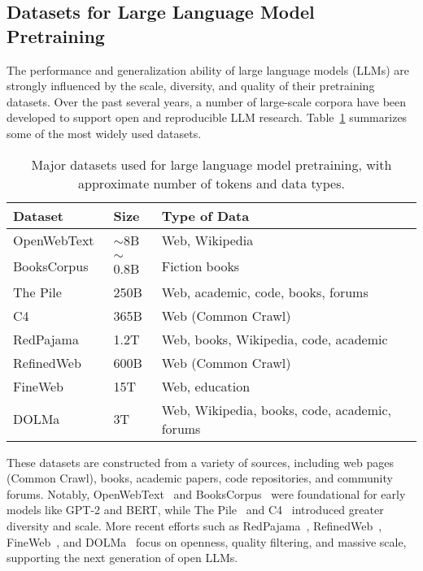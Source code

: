 \subsection{Datasets for Large Language Model Pretraining}
The performance and generalization ability of large language models (LLMs) are strongly influenced by the scale, diversity, and quality of their pretraining datasets. Over the past several years, a number of large-scale corpora have been developed to support open and reproducible LLM research. Table~\ref{tab:llm-datasets} summarizes some of the most widely used datasets.
\begin{table}[h]
\centering
\begin{tabular}{p{3.5cm} p{1.5cm} p{8.5cm}}
\toprule
\textbf{Dataset} & \textbf{Size} & \textbf{Type of Data} \\
\midrule
OpenWebText~\citep{gokaslan2019openweb} & $\sim$8B & Web, Wikipedia \\
BooksCorpus~\citep{zhu2015aligning} & $\sim$0.8B & Fiction books \\
The Pile~\citep{gao2020pile} & 250B & Web, academic, code, books, forums \\
C4~\citep{raffel2020t5} & 365B & Web (Common Crawl) \\
RedPajama~\citep{together2023redpajama} & 1.2T & Web, books, Wikipedia, code, academic \\
RefinedWeb~\citep{penedo2023refinedweb} & 600B & Web (Common Crawl) \\
FineWeb~\citep{penedo2024fineweb} & 15T & Web, education \\
DOLMa~\citep{soldaini2024dolma} & 3T & Web, Wikipedia, books, code, academic, forums \\
\bottomrule
\end{tabular}
\caption{Major datasets used for large language model pretraining, with approximate number of tokens and data types.}
\label{tab:llm-datasets}
\end{table}
These datasets are constructed from a variety of sources, including web pages (Common Crawl), books, academic papers, code repositories, and community forums. Notably, OpenWebText~\citep{gokaslan2019openweb} and BooksCorpus~\citep{zhu2015aligning} were foundational for early models like GPT-2 and BERT, while The Pile~\citep{gao2020pile} and C4~\citep{raffel2020t5} introduced greater diversity and scale. More recent efforts such as RedPajama~\citep{together2023redpajama}, RefinedWeb~\citep{penedo2023refinedweb}, FineWeb~\citep{penedo2024fineweb}, and DOLMa~\citep{soldaini2024dolma} focus on openness, quality filtering, and massive scale, supporting the next generation of open LLMs.

